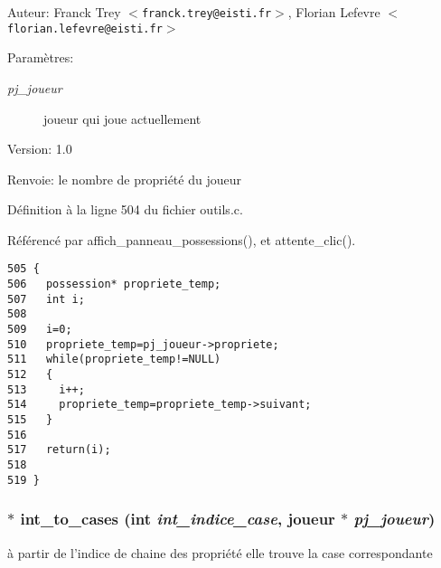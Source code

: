 \begin{Desc}
\item[Auteur:]Franck Trey $<${\tt franck.trey@eisti.fr}$>$, Florian Lefevre $<${\tt florian.lefevre@eisti.fr}$>$\end{Desc}
\begin{Desc}
\item[Param\`{e}tres:]
\begin{description}
\item[{\em pj\_\-joueur}]joueur qui joue actuellement\end{description}
\end{Desc}
\begin{Desc}
\item[Version:]1.0 \end{Desc}
\begin{Desc}
\item[Renvoie:]le nombre de propri\'{e}t\'{e} du joueur \end{Desc}


D\'{e}finition \`{a} la ligne 504 du fichier outils.c.

R\'{e}f\'{e}renc\'{e} par affich\_\-panneau\_\-possessions(), et attente\_\-clic().

\begin{Code}\begin{verbatim}505 {
506   possession* propriete_temp;
507   int i;
508 
509   i=0;
510   propriete_temp=pj_joueur->propriete;
511   while(propriete_temp!=NULL)
512   {
513     i++;
514     propriete_temp=propriete_temp->suivant;
515   }
516   
517   return(i);
518   
519 }
\end{verbatim}\end{Code}


\subsubsection{ $\ast$ int\_\-to\_\-cases (int {\em int\_\-indice\_\-case}, {\bf joueur} $\ast$ {\em pj\_\-joueur})}\label{outils_8c_b0d8a34b21e6a9200451fdb0e46db386}


\`{a} partir de l'indice de chaine des propri\'{e}t\'{e} elle trouve la case correspondante 

